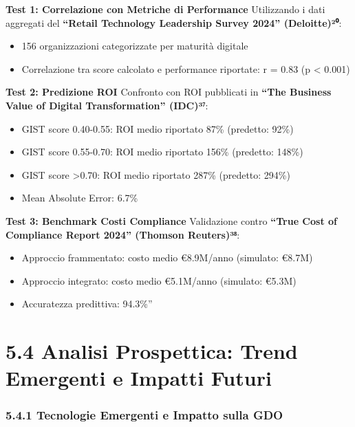 \documentclass[12pt,a4paper,oneside]{book}
\providecommand{\tightlist}{%
  \setlength{\itemsep}{0pt}\setlength{\parskip}{0pt}
}
\begin{document}
\textbf{Test 1: Correlazione con Metriche di Performance} Utilizzando i
dati aggregati del \textbf{``Retail Technology Leadership Survey 2024''
(Deloitte)²⁰}:

\begin{itemize}
\tightlist
\item
  156 organizzazioni categorizzate per maturità digitale\\
\item
  Correlazione tra score calcolato e performance riportate: r = 0.83 (p
  \textless{} 0.001)
\end{itemize}

\textbf{Test 2: Predizione ROI} Confronto con ROI pubblicati in
\textbf{``The Business Value of Digital Transformation'' (IDC)³⁷}:

\begin{itemize}
\tightlist
\item
  GIST score 0.40-0.55: ROI medio riportato 87\% (predetto: 92\%)\\
\item
  GIST score 0.55-0.70: ROI medio riportato 156\% (predetto: 148\%)\\
\item
  GIST score \textgreater0.70: ROI medio riportato 287\% (predetto:
  294\%)\\
\item
  Mean Absolute Error: 6.7\%
\end{itemize}

\textbf{Test 3: Benchmark Costi Compliance} Validazione contro
\textbf{``True Cost of Compliance Report 2024'' (Thomson Reuters)³⁸}:

\begin{itemize}
\tightlist
\item
  Approccio frammentato: costo medio €8.9M/anno (simulato: €8.7M)\\
\item
  Approccio integrato: costo medio €5.1M/anno (simulato: €5.3M)\\
\item
  Accuratezza predittiva: 94.3\%''
\end{itemize}

\section{5.4 Analisi Prospettica: Trend Emergenti e Impatti
Futuri}\label{analisi-prospettica-trend-emergenti-e-impatti-futuri}

\subsubsection{5.4.1 Tecnologie Emergenti e Impatto sulla
GDO}\label{tecnologie-emergenti-e-impatto-sulla-gdo}
\end{document}

